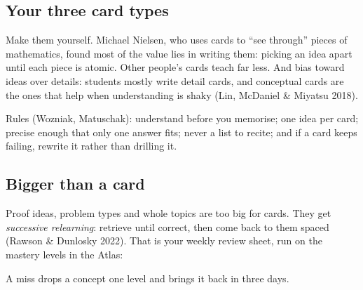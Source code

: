 \documentclass{kaelearn}
\begin{document}
\subsection{Your three card types}
Make them yourself. Michael Nielsen, who uses cards to ``see through'' pieces of mathematics, found most
of the value lies in writing them: picking an idea apart until each piece is atomic. Other people's
cards teach far less. And bias toward ideas over details: students mostly write detail cards, and
conceptual cards are the ones that help when understanding is shaky (Lin, McDaniel \& Miyatsu 2018).

\begin{deck}
\end{deck}

Rules (Wozniak, Matuschak): understand before you memorise; one idea per card; precise enough that only
one answer fits; never a list to recite; and if a card keeps failing, rewrite it rather than drilling it.

\subsection{Bigger than a card}
Proof ideas, problem types and whole topics are too big for cards. They get \emph{successive relearning}:
retrieve until correct, then come back to them spaced (Rawson \& Dunlosky 2022). That is your weekly review
sheet, run on the mastery levels in the Atlas:

\medskip
{}
\par\smallskip\noindent A miss drops a concept one level and brings it back in three days.
\end{document}
